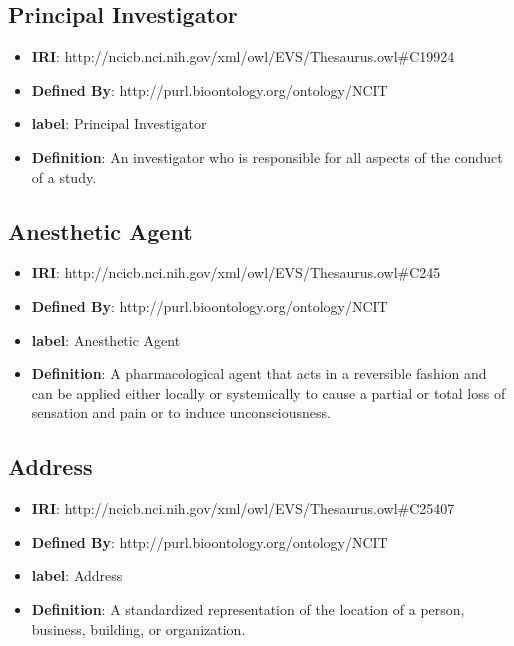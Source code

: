 \documentclass[a4paper,12pt,oneside]{article}
\begin{document}
  \subsection{Principal Investigator}

  \begin{itemize}
     \item \textbf{IRI}: http://ncicb.nci.nih.gov/xml/owl/EVS/Thesaurus.owl\#C19924
     \item \textbf{Defined By}: http://purl.bioontology.org/ontology/NCIT
     \item \textbf{label}: Principal Investigator
     \item \textbf{Definition}: An investigator who is responsible for all aspects of the conduct of a study.
  \end{itemize}


  \subsection{Anesthetic Agent}

  \begin{itemize}
     \item \textbf{IRI}: http://ncicb.nci.nih.gov/xml/owl/EVS/Thesaurus.owl\#C245
     \item \textbf{Defined By}: http://purl.bioontology.org/ontology/NCIT
     \item \textbf{label}: Anesthetic Agent
     \item \textbf{Definition}: A pharmacological agent that acts in a reversible fashion and can be applied either locally or systemically to cause a partial or total loss of sensation and pain or to induce unconsciousness.
  \end{itemize}



  \subsection{Address}

  \begin{itemize}
     \item \textbf{IRI}: http://ncicb.nci.nih.gov/xml/owl/EVS/Thesaurus.owl\#C25407
     \item \textbf{Defined By}: http://purl.bioontology.org/ontology/NCIT
     \item \textbf{label}: Address
     \item \textbf{Definition}: A standardized representation of the location of a person, business, building, or organization.
  \end{itemize}
\end{document}
